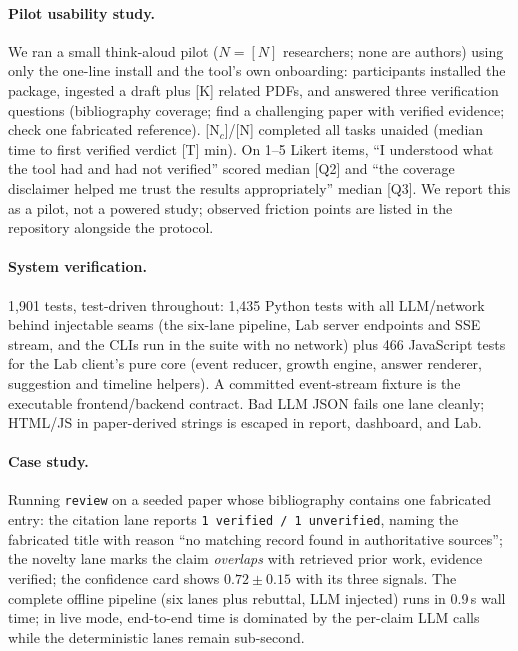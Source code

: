 \documentclass[11pt]{article}
\begin{document}
\paragraph{Pilot usability study.} We ran a small think-aloud pilot ($N=[N]$ researchers; none are authors) using only the one-line install and the tool's own onboarding: participants installed the package, ingested a draft plus [K] related PDFs, and answered three verification questions (bibliography coverage; find a challenging paper with verified evidence; check one fabricated reference). [N$_c$]/[N] completed all tasks unaided (median time to first verified verdict [T] min). On 1--5 Likert items, ``I understood what the tool had and had not verified'' scored median [Q2] and ``the coverage disclaimer helped me trust the results appropriately'' median [Q3]. We report this as a pilot, not a powered study; observed friction points are listed in the repository alongside the protocol.

\paragraph{System verification.} 1{,}901 tests, test-driven throughout: 1{,}435 Python tests with all LLM/network behind injectable seams (the six-lane pipeline, Lab server endpoints and SSE stream, and the CLIs run in the suite with no network) plus 466 JavaScript tests for the Lab client's pure core (event reducer, growth engine, answer renderer, suggestion and timeline helpers). A committed event-stream fixture is the executable frontend/backend contract. Bad LLM JSON fails one lane cleanly; HTML/JS in paper-derived strings is escaped in report, dashboard, and Lab.

\paragraph{Case study.} Running \texttt{review} on a seeded paper whose bibliography contains one fabricated entry: the citation lane reports \texttt{1 verified / 1 unverified}, naming the fabricated title with reason ``no matching record found in authoritative sources''; the novelty lane marks the claim \emph{overlaps} with retrieved prior work, evidence verified; the confidence card shows $0.72 \pm 0.15$ with its three signals. The complete offline pipeline (six lanes plus rebuttal, LLM injected) runs in 0.9\,s wall time; in live mode, end-to-end time is dominated by the per-claim LLM calls while the deterministic lanes remain sub-second.
\end{document}
